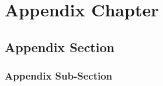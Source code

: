 
\chapter{Appendix Chapter}

\Blindtext[3][1]

\section{Appendix Section}

\Blindtext[2][2]

\subsection{Appendix Sub-Section}

\Blindtext[2][1]